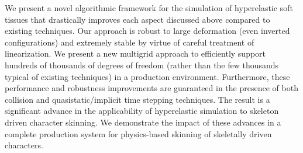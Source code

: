 
We present a novel algorithmic framework for the simulation of hyperelastic soft tissues that drastically improves each aspect discussed above compared to existing techniques. Our approach is robust to large deformation (even inverted configurations) and extremely stable by virtue of careful treatment of linearization. We present a new multigrid approach to efficiently support hundreds of thousands of degrees of freedom (rather than the few thousands typical of existing techniques) in a production environment. Furthermore, these performance and robustness improvements are guaranteed in the presence of both collision and quasistatic/implicit time stepping techniques. The result is a significant advance in the applicability of hyperelastic simulation to skeleton driven character skinning. We demonstrate the impact of these advances in a complete production system for physics-based skinning of skeletally driven characters. 




